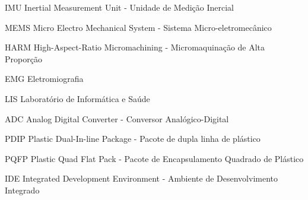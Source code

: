 \begin{siglas}
   \item[IMU] Inertial Measurement Unit - Unidade de Medição Inercial
   \item[MEMS]  Micro Electro Mechanical System - Sistema Micro-eletromecânico
   \item[HARM] High-Aspect-Ratio Micromachining - Micromaquinação de Alta Proporção 
   \item[EMG] Eletromiografia
   \item[LIS] Laboratório de Informática e Saúde
   \item[ADC] Analog Digital Converter - Conversor Analógico-Digital
   \item[PDIP] Plastic Dual-In-line Package - Pacote de dupla linha de plástico
   \item[PQFP] Plastic Quad Flat Pack - Pacote de Encapsulamento Quadrado de Plástico
   \item[IDE] Integrated Development Environment - Ambiente de Desenvolvimento Integrado
\end{siglas}
